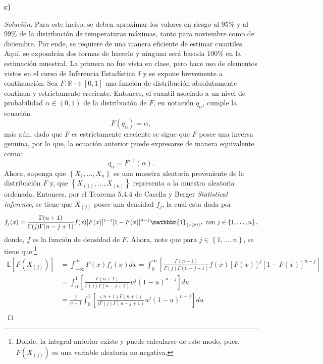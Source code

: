 \documentclass[10.5pt,notitlepage]{article}
\newenvironment{solucion}
  {\begin{proof}[Solución]}
  {\end{proof}}
\newcommand{\RR}{\mathbb{R}}
\newcommand{\EE}{\mathbb{E}}
\newcommand{\corch}[1]{\left[ #1 \right]}
\newcommand{\kis}[1]{\left\{ #1 \right\}}
\theoremstyle{plain}
\begin{document}
\textbf{c)}
\begin{solucion}
Para este inciso, se deben aproximar los valores en riesgo al \(95 \%\) y al \(99\%\) de la distribución de temperaturas máximas, tanto para noviembre como de diciembre. Por ende, se requiere de una manera eficiente de estimar cuantiles. Aquí, se expondrán dos formas de hacerlo y ninguna será basada \(100 \%\) en la estimación muestral. La primera no fue vista en clase, pero hace uso de elementos vistos en el curso de Inferencia Estadística \(I\) y se expone brevemente a continuación: Sea \(F: \RR \mapsto [0,1]\) una función de distribución absolutamente continua y estrictamente creciente. Entonces, el cuantil asociado a un nivel de probabilidad \(\alpha\in (0,1)\) de la distribución de \(F\), en notación \(q_{\alpha}\), cumple la ecuación 
\begin{equation}\label{rel.1}
 F(q_{\alpha}) = \alpha,     
\end{equation}
más aún, dado que \(F\) es estrictamente creciente se sigue que \(F\) posee una inversa genuina, por lo que, la ecuación anterior puede expresarse de manera equivalente como:
\begin{equation}\label{rel.2}
   q_{\alpha} = F^{-1}(\alpha).  
\end{equation}
Ahora, suponga que \(\kis{X_{1}, \hdots, X_{n}}\) es una muestra aleatoria proveniente de la distribución \(F\) y, que \(\kis{X_{(1)}, \hdots, X_{(n)}}\) representa a la muestra aleatoria ordenada. Entonces, por el Teorema 5.4.4 de Casella y Berger \textit{Statistical inference}, se tiene que \(X_{(j)}\) posee una densidad \(f_{j}\), la cual esta dada por 
\[
f_{j}(x) = \frac{\Gamma(n + 1)}{\Gamma(j)\Gamma(n-j+1)}f(x)[F(x)]^{j-1}[1 - F(x)]^{n- j}\mathbbm{1}_{\kis{x \geq 0}}, \text{ con } j \in \kis{1, \hdots, n},  
\]
donde, \(f\) es la función de densidad de \(F\). Ahora, note que para \(j \in \kis{1, \hdots, n}\), se tiene que:\footnote{Donde, la integral anterior existe y puede calcularse de este modo, pues, \(F(X_{(j)})\) es una variable aleatoria no negativa.} 
\begin{align*}
    \EE\corch{F(X_{(j)})} &= \int_{-\infty}^{\infty}F(x)f_{j}(x)dx = \int_{0}^{\infty}\corch{ \frac{\Gamma(n + 1)}{\Gamma(j)\Gamma(n-j+1)}f(x)[F(x)]^{j}[1 - F(x)]^{n- j}}\\
                          &= \int_{0}^{1}\corch{ \frac{\Gamma(n + 1)}{\Gamma(j)\Gamma(n-j+1)}u^{j}(1 - u)^{n- j}}du \\ 
                          &= \frac{j}{n+1}\int_{0}^{1}\corch{ \frac{(n+1)\Gamma(n + 1)}{j\Gamma(j)\Gamma(n-j+1)}u^{j}(1 - u)^{n- j}}du\\

\end{align*}
\end{solucion}
\end{document}

